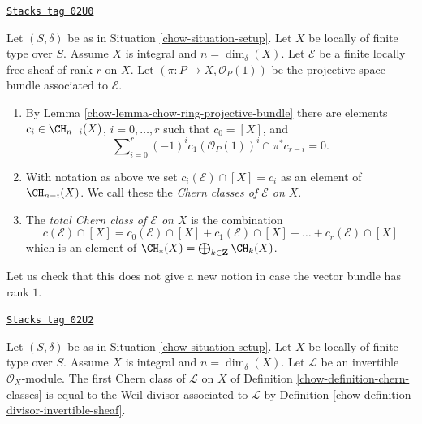 \begin{definition}
\label{chow-definition-chern-classes}
\href{https://stacks.math.columbia.edu/tag/02U0}{\texttt{Stacks tag 02U0}}

Let $(S, \delta)$ be as in Situation \ref{chow-situation-setup}.
Let $X$ be locally of finite type over $S$.
Assume $X$ is integral and $n = \dim_\delta(X)$.
Let $\mathcal{E}$ be a finite locally free sheaf of rank $r$
on $X$. Let $(\pi : P \to X, \mathcal{O}_P(1))$ be the projective space
bundle associated to $\mathcal{E}$.
\begin{enumerate}
\item By Lemma \ref{chow-lemma-chow-ring-projective-bundle} there are
elements $c_i \in \CH_{n - i}(X)$, $i = 0, \ldots, r$
such that $c_0 = [X]$, and
\begin{equation}
\label{equation-chern-classes}
\sum\nolimits_{i = 0}^r
(-1)^i c_1(\mathcal{O}_P(1))^i \cap \pi^*c_{r - i}
= 0.
\end{equation}
\item With notation as above we set
$c_i(\mathcal{E}) \cap [X] = c_i$
as an element of $\CH_{n - i}(X)$.
We call these the {\it Chern classes of $\mathcal{E}$ on $X$}.
\item The {\it total Chern class of $\mathcal{E}$ on $X$}
is the combination
$$
c({\mathcal E}) \cap [X] =
c_0({\mathcal E}) \cap [X]
+ c_1({\mathcal E}) \cap [X] + \ldots
+ c_r({\mathcal E}) \cap [X]
$$
which is an element of
$\CH_*(X) = \bigoplus_{k \in \mathbf{Z}} \CH_k(X)$.
\end{enumerate}
\end{definition}

Let us check that this does not give a new notion in case the
vector bundle has rank $1$.

\begin{lemma}
\label{chow-lemma-first-chern-class}
\href{https://stacks.math.columbia.edu/tag/02U2}{\texttt{Stacks tag 02U2}}

Let $(S, \delta)$ be as in Situation \ref{chow-situation-setup}.
Let $X$ be locally of finite type over $S$.
Assume $X$ is integral and $n = \dim_\delta(X)$.
Let $\mathcal{L}$ be an invertible $\mathcal{O}_X$-module.
The first Chern class of $\mathcal{L}$ on $X$ of
Definition \ref{chow-definition-chern-classes}
is equal to the Weil divisor associated to $\mathcal{L}$
by Definition \ref{chow-definition-divisor-invertible-sheaf}.
\end{lemma}


